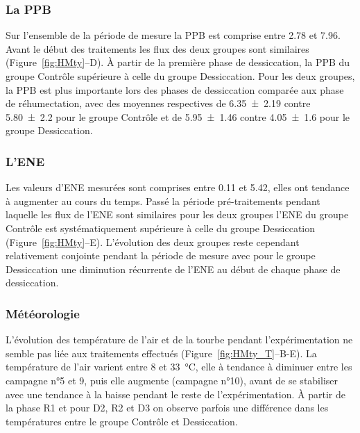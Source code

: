 \subsubsection{La PPB}

Sur l'ensemble de la période de mesure la PPB est comprise entre \num{2.78} et \SI{7.96}{\uml}.
Avant le début des traitements les flux des deux groupes sont similaires (Figure~\ref{fig:HMty}--D).
À partir de la première phase de dessiccation, la PPB du groupe Contrôle supérieure à celle du groupe Dessiccation.
Pour les deux groupes, la PPB est plus importante lors des phases de dessiccation comparée aux phase de réhumectation, avec des moyennes respectives de \num{6.35(219)} contre \num{5.80(220)} pour le groupe Contrôle et de \num{5.95(146)} contre \SI{4.05(160)}{\uml} pour le groupe Dessiccation.

\subsubsection{L'ENE}

Les valeurs d'ENE mesurées sont comprises entre \num{0.11} et \SI{5.42}{\uml}, elles ont tendance à augmenter au cours du temps.
Passé la période pré-traitements pendant laquelle les flux de l'ENE sont similaires pour les deux groupes l'ENE du groupe Contrôle est systématiquement supérieure à celle du groupe Dessiccation (Figure~\ref{fig:HMty}--E).
L'évolution des deux groupes reste cependant relativement conjointe pendant la période de mesure avec pour le groupe Dessiccation une diminution récurrente de l'ENE au début de chaque phase de dessiccation.

\subsubsection{Météorologie}

L'évolution des température de l'air et de la tourbe pendant l'expérimentation ne semble pas liée aux traitements effectués (Figure~\ref{fig:HMty_T}--B-E).
La température de l'air varient entre 8 et \SI{33}{\degreeCelsius}, elle à tendance à diminuer entre les campagne n°5 et 9, puis elle augmente (campagne n°10), avant de se stabiliser avec une tendance à la baisse pendant le reste de l'expérimentation.
À partir de la phase R1 et pour D2, R2 et D3 on observe parfois une différence dans les températures entre le groupe Contrôle et Dessiccation.


